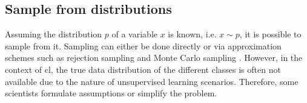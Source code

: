 
\subsection{Sample from distributions}
\label{subsec:SampleViaDistribution}

Assuming the distribution $p$ of a variable $x$ is known, i.e. $x \sim p$, it is possible to sample from it.
Sampling can either be done directly or 
via approximation schemes such as rejection sampling and Monte Carlo sampling \citep{robinson_contrastive_2021}.
However, in the context of \ac{cl}, the true data distribution of the different classes is often not available 
due to the nature of unsupervised learning scenarios.
Therefore, some scientists formulate assumptions or simplify the problem.









